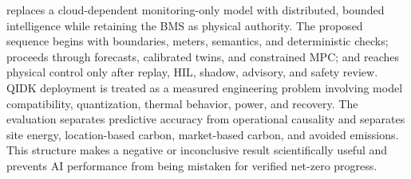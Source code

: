 \system{} replaces a cloud-dependent monitoring-only model with distributed, bounded intelligence while retaining the BMS as physical authority. The proposed sequence begins with boundaries, meters, semantics, and deterministic checks; proceeds through forecasts, calibrated twins, and constrained MPC; and reaches physical control only after replay, HIL, shadow, advisory, and safety review. QIDK deployment is treated as a measured engineering problem involving model compatibility, quantization, thermal behavior, power, and recovery. The evaluation separates predictive accuracy from operational causality and separates site energy, location-based carbon, market-based carbon, and avoided emissions. This structure makes a negative or inconclusive result scientifically useful and prevents AI performance from being mistaken for verified net-zero progress.
